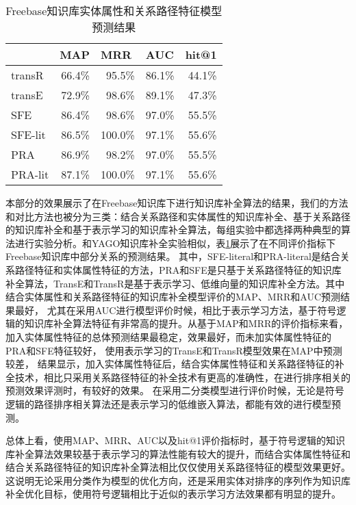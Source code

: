 \begin{table}[htbp]
  \centering
  \caption{Freebase知识库实体属性和关系路径特征模型预测结果}
    \begin{tabular}{|l|r|r|r|r|}
    \hline
          & \multicolumn{1}{l|}{MAP} & \multicolumn{1}{l|}{MRR} & \multicolumn{1}{l|}{AUC} & \multicolumn{1}{l|}{hit@1} \\
    \hline
    transR & 66.4\% & 95.5\% & 86.1\% & 44.1\% \\
    \hline
    transE & 72.9\% & 98.6\% & 89.1\% & 47.3\% \\
    \hline
    SFE   & 86.4\% & 98.6\% & 97.0\% & 55.5\% \\
    \hline
    SFE-lit & 86.5\% & 100.0\% & 97.1\% & 55.6\% \\
    \hline
    PRA   & 86.9\% & 98.2\% & 97.0\% & 55.5\% \\
    \hline
    PRA-lit & 87.1\% & 100.0\% & 97.1\% & 55.6\% \\
    \hline
    \end{tabular}%
  \label{tab:addlabel-fb}%
\end{table}%
本部分的效果展示了在Freebase知识库下进行知识库补全算法的结果，我们的方法和对比方法也被分为三类：结合关系路径和实体属性的知识库补全、基于关系路径的知识库补全和基于表示学习的知识库补全算法，每组实验中都选择两种典型的算法进行实验分析。和YAGO知识库补全实验相似，表\ref{tab:addlabel-fb}展示了在不同评价指标下Freebase知识库中部分关系的预测结果。
其中，SFE-literal和PRA-literal是结合关系路径特征和实体属性特征的方法，PRA和SFE是只基于关系路径特征的知识库补全算法，TransE和TransR是基于表示学习、低维向量的知识库补全方法。其中结合实体属性和关系路径特征的知识库补全模型评价的MAP、MRR和AUC预测结果最好，
尤其在采用AUC进行模型评价时候，相比于表示学习方法，基于符号逻辑的知识库补全算法特征有非常高的提升。从基于MAP和MRR的评价指标来看，加入实体属性特征的总体预测结果最稳定，效果最好，而未加实体属性特征的PRA和SFE特征较好，
使用表示学习的TransE和TransR模型效果在MAP中预测较差，
结果显示，加入实体属性特征后，结合实体属性特征和关系路径特征的补全技术，相比只采用关系路径特征的补全技术有更高的准确性，在进行排序相关的预测效果评测时，有较好的效果。
在采用二分类模型进行评价时候，无论是符号逻辑的路径排序相关算法还是表示学习的低维嵌入算法，都能有效的进行模型预测。

总体上看，使用MAP、MRR、AUC以及hit@1评价指标时，基于符号逻辑的知识库补全算法效果较基于表示学习的算法性能有较大的提升，而结合实体属性特征和结合关系路径特征的知识库补全算法相比仅仅使用关系路径特征的模型效果更好。这说明无论采用分类作为模型的优化方向，还是采用实体对排序的序列作为知识库补全优化目标，使用符号逻辑相比于近似的表示学习方法效果都有明显的提升。


